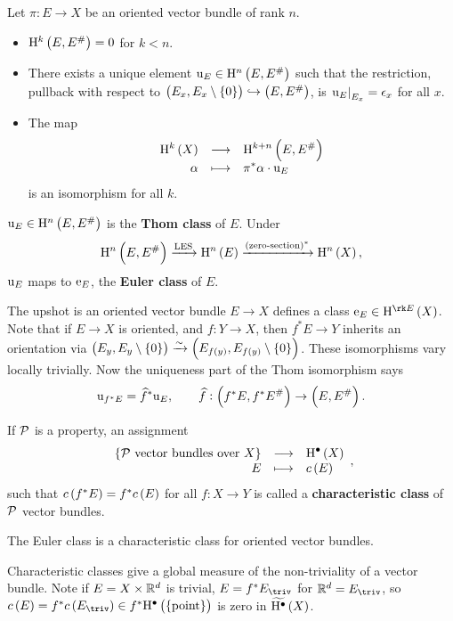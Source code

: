 \begin{theorem}
\label{thm:thomisomorphism}
Let $ \pi : E \to X $ be an oriented vector bundle of rank $ n $.
\begin{itemize}
\item $ \H^k\br{E, E^\#} = 0 $ for $ k < n $.
\item There exists a unique element $ \u_E \in \H^n\br{E, E^\#} $ such that the restriction, pullback with respect to $ \br{E_x, E_x \setminus \cbr{0}} \hookrightarrow \br{E, E^\#} $, is $ \left. \mathrm{u}_E \right|_{E_x} = \epsilon_x $ for all $ x $.
\item The map
$$ \function{\H^k\br{X}}{\H^{k + n}\br{E, E^\#}}{\alpha}{\pi^*\alpha \cdot \u_E} $$
is an isomorphism for all $ k $.
\end{itemize}
\end{theorem}

\begin{definition*}
$ \u_E \in \H^n\br{E, E^\#} $ is the \textbf{Thom class} of $ E $. Under
$$ \H^n\br{E, E^\#} \xrightarrow{\text{LES}} \H^n\br{E} \xrightarrow{\br{\text{zero-section}}^*} \H^n\br{X}, $$
$ \mathrm{u}_E $ maps to $ \mathrm{e}_E $, the \textbf{Euler class} of $ E $.
\end{definition*}

The upshot is an oriented vector bundle $ E \to X $ defines a class $ \e_E \in \H^{\rk E}\br{X} $. Note that if $ E \to X $ is oriented, and $ f : Y \to X $, then $ f^*E \to Y $ inherits an orientation via $ \br{E_y, E_y \setminus \cbr{0}} \xrightarrow{\sim} \br{E_{f\br{y}}, E_{f\br{y}} \setminus \cbr{0}} $. These isomorphisms vary locally trivially. Now the uniqueness part of the Thom isomorphism says
$$ \u_{f^*E} = \widehat{f}^*\u_E, \qquad \widehat{f} : \br{f^*E, f^*E^\#} \to \br{E, E^\#}. $$

\pagebreak

\begin{definition*}
If $ \mathcal{P} $ is a property, an assignment
$$ \function{\cbr{\PPP \ \text{vector bundles over} \ X}}{\H^\bullet\br{X}}{E}{c\br{E}}, $$
such that $ c\br{f^*E} = f^*c\br{E} $ for all $ f : X \to Y $ is called a \textbf{characteristic class} of $ \mathcal{P} $ vector bundles.
\end{definition*}

\begin{example*}
The Euler class is a characteristic class for oriented vector bundles.
\end{example*}

Characteristic classes give a global measure of the non-triviality of a vector bundle. Note if $ E = X \times \mathbb{R}^d $ is trivial, $ E = f^*E_{\triv} $ for $ \RR^d = E_{\triv} $, so $ c\br{E} = f^*c\br{E_{\triv}} \in f^*\H^\bullet\br{\pt} $ is zero in $ \widetilde{\H^\bullet}\br{X} $.

